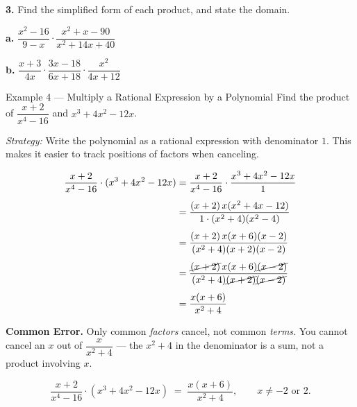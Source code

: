 \documentclass[11pt]{article}
\newcommand{\workspace}[1]{\vspace{#1}}
\begin{document}
\begin{tryit}
\textbf{3.} Find the simplified form of each product, and state the domain.

\vspace{0.3em}
\begin{minipage}[t]{0.48\textwidth}
\textbf{a.} $\dfrac{x^{2}-16}{9-x}\cdot \dfrac{x^{2}+x-90}{x^{2}+14x+40}$
\workspace{3.5cm}
\end{minipage}\hfill
\begin{minipage}[t]{0.48\textwidth}
\textbf{b.} $\dfrac{x+3}{4x}\cdot \dfrac{3x-18}{6x+18}\cdot \dfrac{x^{2}}{4x+12}$
\workspace{3.5cm}
\end{minipage}
\end{tryit}

\newpage

\begin{example}{Example 4 --- Multiply a Rational Expression by a Polynomial}
Find the product of $\dfrac{x+2}{x^{4}-16}$ and $x^{3}+4x^{2}-12x$.

\vspace{0.4em}
\textit{Strategy:} Write the polynomial as a rational expression with denominator $1$. This makes it easier to track positions of factors when canceling.

\begin{align*}
\dfrac{x+2}{x^{4}-16}\cdot (x^{3}+4x^{2}-12x) &= \dfrac{x+2}{x^{4}-16}\cdot \dfrac{x^{3}+4x^{2}-12x}{1} \\[4pt]
&= \dfrac{(x+2)\,x(x^{2}+4x-12)}{1\cdot (x^{2}+4)(x^{2}-4)} \\[4pt]
&= \dfrac{(x+2)\,x(x+6)(x-2)}{(x^{2}+4)(x+2)(x-2)} \\[4pt]
&= \dfrac{\cancel{(x+2)}\,x(x+6)\cancel{(x-2)}}{(x^{2}+4)\cancel{(x+2)}\cancel{(x-2)}} \\[4pt]
&= \dfrac{x(x+6)}{x^{2}+4}
\end{align*}

\begin{annot}
\textbf{Common Error.} Only common \emph{factors} cancel, not common \emph{terms}. You cannot cancel an $x$ out of $\dfrac{x}{x^{2}+4}$ --- the $x^{2}+4$ in the denominator is a sum, not a product involving $x$.
\end{annot}

\[
\dfrac{x+2}{x^{4}-16}\cdot (x^{3}+4x^{2}-12x) \;=\; \dfrac{x(x+6)}{x^{2}+4}, \qquad x \neq -2 \text{ or } 2.
\]
\end{example}
\end{document}
